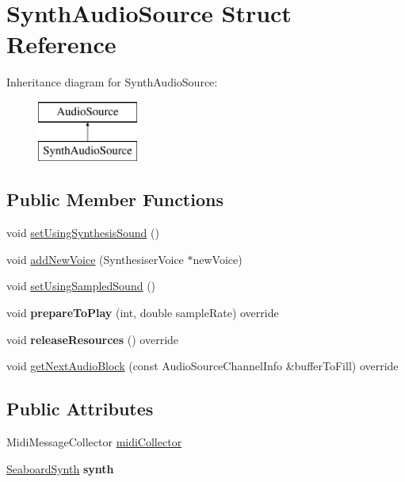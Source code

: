 \hypertarget{struct_synth_audio_source}{\section{Synth\-Audio\-Source Struct Reference}
\label{struct_synth_audio_source}
}
Inheritance diagram for Synth\-Audio\-Source\-:\begin{figure}[H]
\begin{center}
\leavevmode
\includegraphics[height=2.000000cm]{struct_synth_audio_source}
\end{center}
\end{figure}
\subsection*{Public Member Functions}
\begin{DoxyCompactItemize}
\item 
void \hyperlink{struct_synth_audio_source_ada38fa8e024834b76bbc7d57870e1259}{set\-Using\-Synthesis\-Sound} ()
\item 
void \hyperlink{struct_synth_audio_source_ab05f34320b8f2ef573bd31119a766e62}{add\-New\-Voice} (Synthesiser\-Voice $\ast$new\-Voice)
\item 
void \hyperlink{struct_synth_audio_source_a541b410a17592aac9e477c660fea67bc}{set\-Using\-Sampled\-Sound} ()
\item 
\hypertarget{struct_synth_audio_source_a9923d4a5011b0a3c73cebca9c7214077}{void {\bfseries prepare\-To\-Play} (int, double sample\-Rate) override}\label{struct_synth_audio_source_a9923d4a5011b0a3c73cebca9c7214077}

\item 
\hypertarget{struct_synth_audio_source_ac443459932ce478082ddc5c2765d919b}{void {\bfseries release\-Resources} () override}\label{struct_synth_audio_source_ac443459932ce478082ddc5c2765d919b}

\item 
void \hyperlink{struct_synth_audio_source_a4126f6e765478013a6c060b722af3d68}{get\-Next\-Audio\-Block} (const Audio\-Source\-Channel\-Info \&buffer\-To\-Fill) override
\end{DoxyCompactItemize}
\subsection*{Public Attributes}
\begin{DoxyCompactItemize}
\item 
Midi\-Message\-Collector \hyperlink{struct_synth_audio_source_aac0466f0cf4680f25de5cd2789b4bb7c}{midi\-Collector}
\item 
\hypertarget{struct_synth_audio_source_a791f6c2b8ce8f5964314f4107acc1304}{\hyperlink{struct_seaboard_synth}{Seaboard\-Synth} {\bfseries synth}}\label{struct_synth_audio_source_a791f6c2b8ce8f5964314f4107acc1304}

\end{DoxyCompactItemize}


